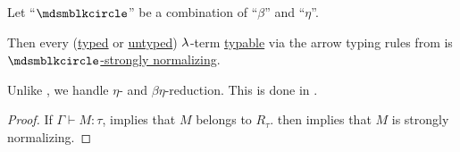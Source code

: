 \begin{theorem}\label{thm:simply_typable_terms_are_strongly_normalizing}
  Let \enquote{\( {\Anon} \)} be a combination of \enquote{\( \beta \)} and \enquote{\( \eta \)}.

  Then every (\hyperref[def:typed_lambda_term]{typed} or \hyperref[def:lambda_term]{untyped}) \( \mathrm{\lambda} \)-term \hyperref[def:typability]{typable} via the arrow typing rules from  is \hyperref[def:strongly_normalizing_lambda_term]{\( \Anon \)-strongly normalizing}.
\end{theorem}
\begin{comments}
  \item Unlike , we handle \( \eta \)- and \( \beta\eta \)-reduction. This is done in .
\end{comments}
\begin{proof}
  If \( \Gamma \vdash M: \tau \),  implies that \( M \) belongs to \( R_\tau \).  then implies that \( M \) is strongly normalizing.
\end{proof}
